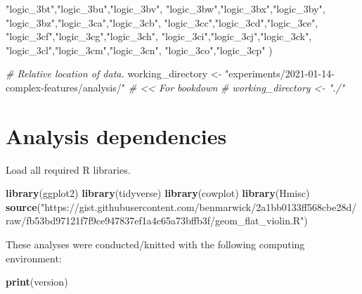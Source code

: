 \documentclass[]{book}
\newenvironment{Shaded}{\begin{snugshade}}{\end{snugshade}}
\newcommand{\CommentTok}[1]{\textcolor[rgb]{0.56,0.35,0.01}{\textit{#1}}}
\newcommand{\KeywordTok}[1]{\textcolor[rgb]{0.13,0.29,0.53}{\textbf{#1}}}
\newcommand{\NormalTok}[1]{#1}
\newcommand{\StringTok}[1]{\textcolor[rgb]{0.31,0.60,0.02}{#1}}
\begin{document}
\begin{Shaded}
\begin{Highlighting}[]
  \StringTok{"logic_3bt"}\NormalTok{,}\StringTok{"logic_3bu"}\NormalTok{,}\StringTok{"logic_3bv"}\NormalTok{,}
  \StringTok{"logic_3bw"}\NormalTok{,}\StringTok{"logic_3bx"}\NormalTok{,}\StringTok{"logic_3by"}\NormalTok{,}
  \StringTok{"logic_3bz"}\NormalTok{,}\StringTok{"logic_3ca"}\NormalTok{,}\StringTok{"logic_3cb"}\NormalTok{,}
  \StringTok{"logic_3cc"}\NormalTok{,}\StringTok{"logic_3cd"}\NormalTok{,}\StringTok{"logic_3ce"}\NormalTok{,}
  \StringTok{"logic_3cf"}\NormalTok{,}\StringTok{"logic_3cg"}\NormalTok{,}\StringTok{"logic_3ch"}\NormalTok{,}
  \StringTok{"logic_3ci"}\NormalTok{,}\StringTok{"logic_3cj"}\NormalTok{,}\StringTok{"logic_3ck"}\NormalTok{,}
  \StringTok{"logic_3cl"}\NormalTok{,}\StringTok{"logic_3cm"}\NormalTok{,}\StringTok{"logic_3cn"}\NormalTok{,}
  \StringTok{"logic_3co"}\NormalTok{,}\StringTok{"logic_3cp"}
\NormalTok{)}

\CommentTok{# Relative location of data.}
\NormalTok{working_directory <-}\StringTok{ "experiments/2021-01-14-complex-features/analysis/"} \CommentTok{# << For bookdown}
\CommentTok{# working_directory <- "./"}
\end{Highlighting}
\end{Shaded}

\hypertarget{analysis-dependencies-2}{%
\section{Analysis dependencies}\label{analysis-dependencies-2}}

Load all required R libraries.

\begin{Shaded}
\begin{Highlighting}[]
\KeywordTok{library}\NormalTok{(ggplot2)}
\KeywordTok{library}\NormalTok{(tidyverse)}
\KeywordTok{library}\NormalTok{(cowplot)}
\KeywordTok{library}\NormalTok{(Hmisc)}
\KeywordTok{source}\NormalTok{(}\StringTok{"https://gist.githubusercontent.com/benmarwick/2a1bb0133ff568cbe28d/raw/fb53bd97121f7f9ce947837ef1a4c65a73bffb3f/geom_flat_violin.R"}\NormalTok{)}
\end{Highlighting}
\end{Shaded}

These analyses were conducted/knitted with the following computing environment:

\begin{Shaded}
\begin{Highlighting}[]
\KeywordTok{print}\NormalTok{(version)}
\end{Highlighting}
\end{Shaded}
\end{document}
